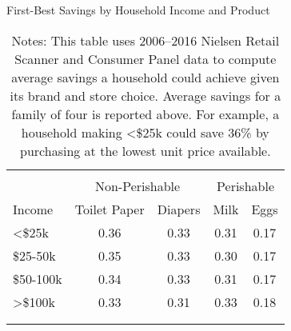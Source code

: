 \begin{table}[!htbp] \centering
\caption{First-Best Savings by Household Income and Product}
\label{tab:excessSpending}
\begin{tabular}{lcccc}
\\[-1.8ex]\hline
\hline \\[-1.8ex]
            & \multicolumn{2}{c}{Non-Perishable} & \multicolumn{2}{c}{Perishable} \\
              \cline{2-3}                             \cline{4-5}
Income      & Toilet Paper  & Diapers & Milk  & Eggs \\
\hline
<\$25k      & 0.36          & 0.33    & 0.31  & 0.17 \\
\$25-50k    & 0.35          & 0.33    & 0.30  & 0.17 \\
\$50-100k   & 0.34          & 0.33    & 0.31  & 0.17 \\
>\$100k     & 0.33          & 0.31    & 0.33  & 0.18  \\
\\[-1.8ex]\hline
\hline \\[-1.8ex]
\end{tabular}
\caption*{Notes: This table uses 2006--2016 Nielsen Retail Scanner and Consumer Panel data to compute average savings a household could achieve given its brand and store choice. Average savings for a family of four is reported above. For example, a household making <\$25k could save 36\% by purchasing at the lowest unit price available.}
\end{table}
